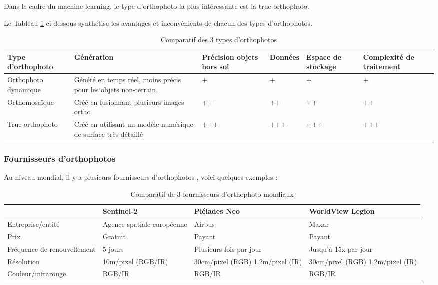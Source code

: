 Dans le cadre du machine learning, le type d'orthophoto la plus intéressante est la true orthophoto.

Le Tableau \ref{tab:comparatif_orthophotos} ci-dessous synthétise les avantages et inconvénients de chacun des types d'orthophotos.

\begin{table}[H]
    \centering
    \begin{tabular}{|p{2.5cm}|p{3cm}|p{1.5cm}|p{1.5cm}|p{1.5cm}|p{2cm}|}
    \hline
    \textbf{Type d'orthophoto} & \textbf{Génération} & \textbf{Précision objets hors sol} & \textbf{Données} & \textbf{Espace de stockage} & \textbf{Complexité de traitement} \\
    \hline
    Orthophoto dynamique & Généré en temps réel, moins précis pour les objets non-terrain. & + & + & + & + \\
    \hline
    Orthomosaïque & Créé en fusionnant plusieurs images ortho & ++ & ++ & ++ & ++ \\
    \hline
    True orthophoto & Créé en utilisant un modèle numérique de surface très détaillé & +++ & +++ & +++ & +++ \\
    \hline
    \end{tabular}
    \caption{Comparatif des 3 types d'orthophotos}
    \label{tab:comparatif_orthophotos}
\end{table}

\subsubsection{Fournisseurs d'orthophotos}

Au niveau mondial, il y a plusieurs fournisseurs d'orthophotos \cite{stdl_recherche_2024}, voici quelques exemples :

\begin{table}[htbp]
    \centering
    \begin{tabular}{|p{3cm}|p{3cm}|p{3cm}|p{3cm}|}
    \cline{2-4}
    \multicolumn{1}{c|}{} & \textbf{Sentinel-2} & \textbf{Pléiades Neo} & \textbf{WorldView Legion} \\
    \hline
    Entreprise/entité & Agence spatiale européenne & Airbus & Maxar \\
    \hline
    Prix & Gratuit & Payant & Payant \\
    \hline
    Fréquence de renouvellement & 5 jours & Plusieurs fois par jour & Jusqu'à 15x par jour \\
    \hline
    Résolution & 10m/pixel (RGB/IR) & 30cm/pixel (RGB) 1.2m/pixel (IR) & 30cm/pixel (RGB) 1.2m/pixel (IR) \\
    \hline
    Couleur/infrarouge & RGB/IR & RGB/IR & RGB/IR \\
    \hline
    \end{tabular}
    \caption{Comparatif de 3 fournisseurs d'orthophoto mondiaux}
    \label{tab:fournisseurs_orthophotos}
\end{table}

